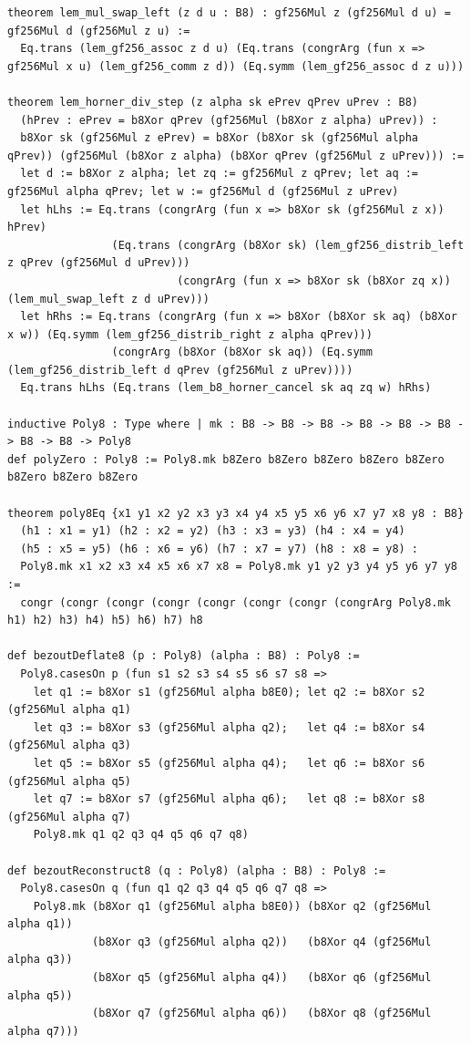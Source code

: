 \documentclass[11pt,letterpaper]{article}
\theoremstyle{spectralthm}
\begin{document}
\begin{lstlisting}[language=Lean4,caption={Standalone Pure Init.Prelude Term-Mode Lean 4 Kernel Suite (thm30--thm61, v0.0.0, 0 sorry, 0 axioms).},label={lst:lean_unified}]
theorem lem_mul_swap_left (z d u : B8) : gf256Mul z (gf256Mul d u) = gf256Mul d (gf256Mul z u) :=
  Eq.trans (lem_gf256_assoc z d u) (Eq.trans (congrArg (fun x => gf256Mul x u) (lem_gf256_comm z d)) (Eq.symm (lem_gf256_assoc d z u)))

theorem lem_horner_div_step (z alpha sk ePrev qPrev uPrev : B8)
  (hPrev : ePrev = b8Xor qPrev (gf256Mul (b8Xor z alpha) uPrev)) :
  b8Xor sk (gf256Mul z ePrev) = b8Xor (b8Xor sk (gf256Mul alpha qPrev)) (gf256Mul (b8Xor z alpha) (b8Xor qPrev (gf256Mul z uPrev))) :=
  let d := b8Xor z alpha; let zq := gf256Mul z qPrev; let aq := gf256Mul alpha qPrev; let w := gf256Mul d (gf256Mul z uPrev)
  let hLhs := Eq.trans (congrArg (fun x => b8Xor sk (gf256Mul z x)) hPrev)
                (Eq.trans (congrArg (b8Xor sk) (lem_gf256_distrib_left z qPrev (gf256Mul d uPrev)))
                          (congrArg (fun x => b8Xor sk (b8Xor zq x)) (lem_mul_swap_left z d uPrev)))
  let hRhs := Eq.trans (congrArg (fun x => b8Xor (b8Xor sk aq) (b8Xor x w)) (Eq.symm (lem_gf256_distrib_right z alpha qPrev)))
                (congrArg (b8Xor (b8Xor sk aq)) (Eq.symm (lem_gf256_distrib_left d qPrev (gf256Mul z uPrev))))
  Eq.trans hLhs (Eq.trans (lem_b8_horner_cancel sk aq zq w) hRhs)

inductive Poly8 : Type where | mk : B8 -> B8 -> B8 -> B8 -> B8 -> B8 -> B8 -> B8 -> Poly8
def polyZero : Poly8 := Poly8.mk b8Zero b8Zero b8Zero b8Zero b8Zero b8Zero b8Zero b8Zero

theorem poly8Eq {x1 y1 x2 y2 x3 y3 x4 y4 x5 y5 x6 y6 x7 y7 x8 y8 : B8}
  (h1 : x1 = y1) (h2 : x2 = y2) (h3 : x3 = y3) (h4 : x4 = y4)
  (h5 : x5 = y5) (h6 : x6 = y6) (h7 : x7 = y7) (h8 : x8 = y8) :
  Poly8.mk x1 x2 x3 x4 x5 x6 x7 x8 = Poly8.mk y1 y2 y3 y4 y5 y6 y7 y8 :=
  congr (congr (congr (congr (congr (congr (congr (congrArg Poly8.mk h1) h2) h3) h4) h5) h6) h7) h8

def bezoutDeflate8 (p : Poly8) (alpha : B8) : Poly8 :=
  Poly8.casesOn p (fun s1 s2 s3 s4 s5 s6 s7 s8 =>
    let q1 := b8Xor s1 (gf256Mul alpha b8E0); let q2 := b8Xor s2 (gf256Mul alpha q1)
    let q3 := b8Xor s3 (gf256Mul alpha q2);   let q4 := b8Xor s4 (gf256Mul alpha q3)
    let q5 := b8Xor s5 (gf256Mul alpha q4);   let q6 := b8Xor s6 (gf256Mul alpha q5)
    let q7 := b8Xor s7 (gf256Mul alpha q6);   let q8 := b8Xor s8 (gf256Mul alpha q7)
    Poly8.mk q1 q2 q3 q4 q5 q6 q7 q8)

def bezoutReconstruct8 (q : Poly8) (alpha : B8) : Poly8 :=
  Poly8.casesOn q (fun q1 q2 q3 q4 q5 q6 q7 q8 =>
    Poly8.mk (b8Xor q1 (gf256Mul alpha b8E0)) (b8Xor q2 (gf256Mul alpha q1))
             (b8Xor q3 (gf256Mul alpha q2))   (b8Xor q4 (gf256Mul alpha q3))
             (b8Xor q5 (gf256Mul alpha q4))   (b8Xor q6 (gf256Mul alpha q5))
             (b8Xor q7 (gf256Mul alpha q6))   (b8Xor q8 (gf256Mul alpha q7)))


\end{lstlisting}
\end{document}
